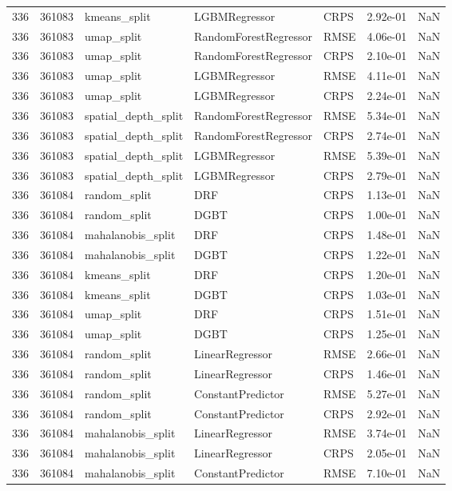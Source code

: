 \begin{tabular}{rrlllrr}
336 & 361083 & kmeans\_split & LGBMRegressor & CRPS & 2.92e-01 & NaN \\
336 & 361083 & umap\_split & RandomForestRegressor & RMSE & 4.06e-01 & NaN \\
336 & 361083 & umap\_split & RandomForestRegressor & CRPS & 2.10e-01 & NaN \\
336 & 361083 & umap\_split & LGBMRegressor & RMSE & 4.11e-01 & NaN \\
336 & 361083 & umap\_split & LGBMRegressor & CRPS & 2.24e-01 & NaN \\
336 & 361083 & spatial\_depth\_split & RandomForestRegressor & RMSE & 5.34e-01 & NaN \\
336 & 361083 & spatial\_depth\_split & RandomForestRegressor & CRPS & 2.74e-01 & NaN \\
336 & 361083 & spatial\_depth\_split & LGBMRegressor & RMSE & 5.39e-01 & NaN \\
336 & 361083 & spatial\_depth\_split & LGBMRegressor & CRPS & 2.79e-01 & NaN \\
336 & 361084 & random\_split & DRF & CRPS & 1.13e-01 & NaN \\
336 & 361084 & random\_split & DGBT & CRPS & 1.00e-01 & NaN \\
336 & 361084 & mahalanobis\_split & DRF & CRPS & 1.48e-01 & NaN \\
336 & 361084 & mahalanobis\_split & DGBT & CRPS & 1.22e-01 & NaN \\
336 & 361084 & kmeans\_split & DRF & CRPS & 1.20e-01 & NaN \\
336 & 361084 & kmeans\_split & DGBT & CRPS & 1.03e-01 & NaN \\
336 & 361084 & umap\_split & DRF & CRPS & 1.51e-01 & NaN \\
336 & 361084 & umap\_split & DGBT & CRPS & 1.25e-01 & NaN \\
336 & 361084 & random\_split & LinearRegressor & RMSE & 2.66e-01 & NaN \\
336 & 361084 & random\_split & LinearRegressor & CRPS & 1.46e-01 & NaN \\
336 & 361084 & random\_split & ConstantPredictor & RMSE & 5.27e-01 & NaN \\
336 & 361084 & random\_split & ConstantPredictor & CRPS & 2.92e-01 & NaN \\
336 & 361084 & mahalanobis\_split & LinearRegressor & RMSE & 3.74e-01 & NaN \\
336 & 361084 & mahalanobis\_split & LinearRegressor & CRPS & 2.05e-01 & NaN \\
336 & 361084 & mahalanobis\_split & ConstantPredictor & RMSE & 7.10e-01 & NaN \\

\end{tabular}
